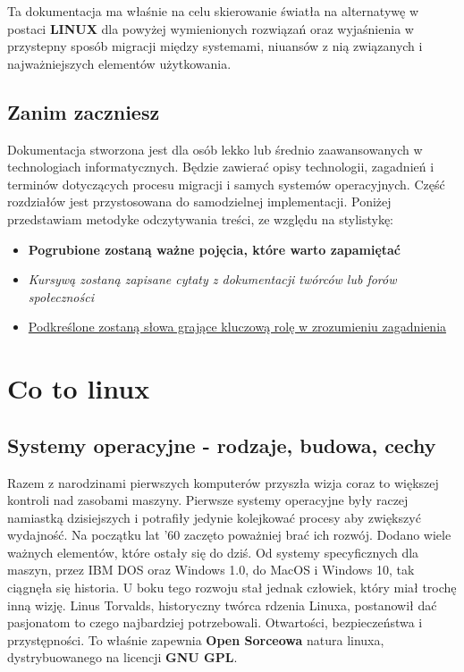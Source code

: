 \documentclass[10pt,a4paper]{report}
\begin{document}
Ta dokumentacja ma właśnie na celu skierowanie światła na alternatywę w postaci \textbf{LINUX} dla powyżej wymienionych rozwiązań oraz wyjaśnienia w przystepny sposób migracji między systemami, niuansów z nią związanych i najważniejszych elementów użytkowania.
	
	\section{Zanim zaczniesz}
	
Dokumentacja stworzona jest dla osób lekko lub średnio zaawansowanych w technologiach informatycznych. Będzie zawierać opisy technologii, zagadnień i terminów dotyczących procesu migracji i samych systemów operacyjnych. Część rozdziałów jest przystosowana do samodzielnej implementacji. Poniżej przedstawiam metodyke odczytywania treści, ze względu na stylistykę:
\begin{itemize}
\item \textbf{Pogrubione zostaną ważne pojęcia, które warto zapamiętać}
\item \textit{Kursywą zostaną zapisane cytaty z dokumentacji twórców lub forów społeczności}
\item \underline{Podkreślone zostaną słowa grające kluczową rolę w zrozumieniu zagadnienia}
\end{itemize}


\tableofcontents

\newpage

\chapter{Co to linux}

	\section{Systemy operacyjne - rodzaje, budowa, cechy}

Razem z narodzinami pierwszych komputerów przyszła wizja coraz to większej kontroli nad zasobami maszyny. Pierwsze systemy operacyjne były raczej namiastką dzisiejszych i potrafiły jedynie kolejkować procesy aby zwiększyć wydajność. Na początku lat '60 zaczęto poważniej brać ich rozwój. Dodano wiele ważnych elementów, które ostały się do dziś. Od systemy specyficznych dla maszyn, przez IBM DOS oraz Windows 1.0, do MacOS i Windows 10, tak ciągnęła się historia. U boku tego rozwoju stał jednak człowiek, który miał trochę inną wizję. Linus Torvalds, historyczny twórca rdzenia Linuxa, postanowił dać pasjonatom to czego najbardziej potrzebowali. Otwartości, bezpieczeństwa i przystępności. To właśnie zapewnia \textbf{Open Sorceowa} natura linuxa, dystrybuowanego na licencji \textbf{GNU GPL}.\\
\end{document}
